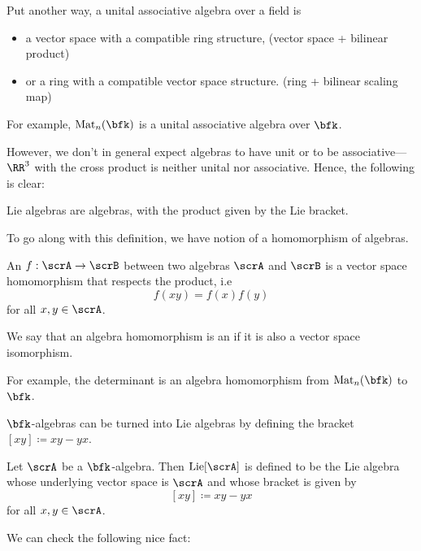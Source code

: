 \documentclass{article}
\newcommand{\lb}[1]{\ensuremath{\left[{#1}\right]}}
\DeclareMathOperator{\Mat}{Mat}
\DeclareMathOperator{\Lie}{Lie}
\begin{document}
Put another way, a unital associative algebra over a field is 
\begin{itemize}
    \item 
        a vector space with a compatible ring structure, (vector space + bilinear product)
    \item 
        or a ring with a compatible vector space structure.
        (ring + bilinear scaling map)
\end{itemize}
For example, $\Mat_n(\bfk)$ is a unital associative algebra over $\bfk$.

However, we don't in general expect algebras to have unit or to be associative--- $\RR^3$ with the cross product is neither unital nor associative.
Hence, the following is clear:

\begin{proposition}
    Lie algebras are algebras, with the product given by the Lie bracket.
\end{proposition}

To go along with this definition, we have notion of a homomorphism of algebras.

\begin{definition}
    An  $f: \scrA \to \scrB$ between two algebras $\scrA$ and $\scrB$ is a vector space homomorphism that respects the product, i.e
    \[
        f(xy) 
        = 
        f(x)f(y)
    \]
    for all $x, y \in \scrA$.

    We say that an algebra homomorphism is an  if it is also a vector space isomorphism.
\end{definition}

For example, the determinant is an algebra homomorphism from $\Mat_n(\bfk)$ to $\bfk$.

$\bfk$-algebras can be turned into Lie algebras by defining the bracket $\lb{xy} \coloneq xy - yx$.

\begin{definition}
    Let $\scrA$ be a $\bfk$-algebra.
    Then $\Lie[\scrA]$ is defined to be the Lie algebra whose underlying vector space is $\scrA$ and whose bracket is given by
    \[
        \lb{xy}
        \coloneq
        xy - yx
    \]
    for all $x, y \in \scrA$.
\end{definition}

We can check the following nice fact: 
\end{document}
